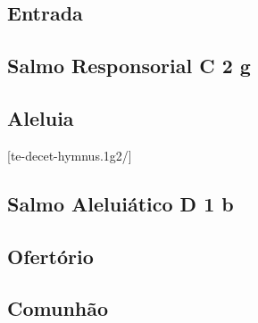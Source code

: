 
\subsection{Entrada}\label{subsection:tempus-per-annum/missa-4/introitus}

\AllowPageFlush

\subsection[Salmo Responsorial]{Salmo Responsorial \textmd{C 2 g}}\label{subsection:tempus-per-annum/missa-4/psalmus-responsorius}

\subsection{Aleluia}\label{subsection:tempus-per-annum/missa-4/alleluia}
[te-decet-hymnus.1g2/]

\AllowPageFlush

\subsection[Salmo Aleluiático]{Salmo Aleluiático \textmd{D 1 b}}\label{subsection:tempus-per-annum/missa-4/psalmus-alleluiaticus}

\AllowPageFlush

\subsection{Ofertório}\label{subsection:tempus-per-annum/missa-4/offertorium}

\AllowPageFlush

\subsection{Comunhão}\label{subsection:tempus-per-annum/missa-4/communio}
